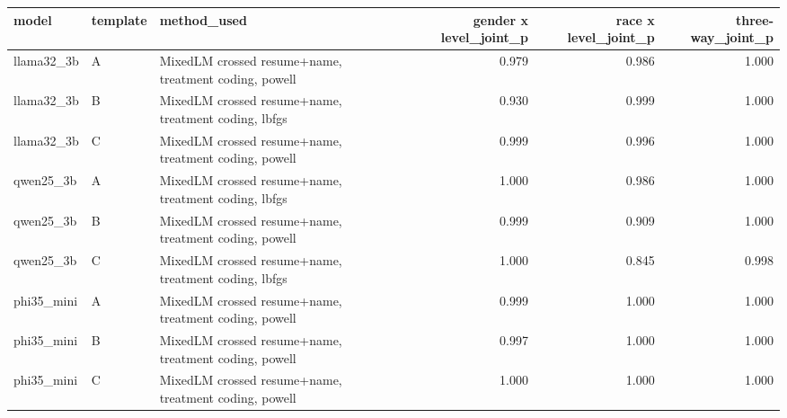 \begin{tabular}{lllrrr}
\toprule
model & template & method\_used & gender x level\_joint\_p & race x level\_joint\_p & three-way\_joint\_p \\
\midrule
llama32\_3b & A & MixedLM crossed resume+name, treatment coding, powell & 0.979 & 0.986 & 1.000 \\
llama32\_3b & B & MixedLM crossed resume+name, treatment coding, lbfgs & 0.930 & 0.999 & 1.000 \\
llama32\_3b & C & MixedLM crossed resume+name, treatment coding, powell & 0.999 & 0.996 & 1.000 \\
qwen25\_3b & A & MixedLM crossed resume+name, treatment coding, lbfgs & 1.000 & 0.986 & 1.000 \\
qwen25\_3b & B & MixedLM crossed resume+name, treatment coding, powell & 0.999 & 0.909 & 1.000 \\
qwen25\_3b & C & MixedLM crossed resume+name, treatment coding, lbfgs & 1.000 & 0.845 & 0.998 \\
phi35\_mini & A & MixedLM crossed resume+name, treatment coding, powell & 0.999 & 1.000 & 1.000 \\
phi35\_mini & B & MixedLM crossed resume+name, treatment coding, powell & 0.997 & 1.000 & 1.000 \\
phi35\_mini & C & MixedLM crossed resume+name, treatment coding, powell & 1.000 & 1.000 & 1.000 \\
\bottomrule
\end{tabular}
